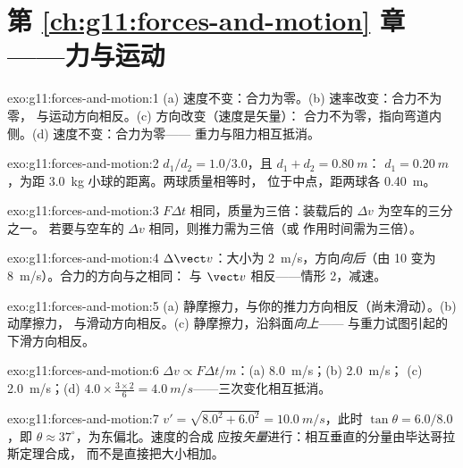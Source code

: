 \section*{第 \ref{ch:g11:forces-and-motion} 章——力与运动}

\begin{solution}{exo:g11:forces-and-motion:1}
(a) 速度不变：合力为零。(b) 速率改变：合力不为零，
与运动方向相反。(c) 方向改变（速度是矢量）：
合力不为零，指向弯道内侧。(d) 速度不变：合力为零——
重力与阻力相互抵消。
\end{solution}

\begin{solution}{exo:g11:forces-and-motion:2}
$d_1/d_2 = 1.0/3.0$，且 $d_1 + d_2 = \qty{0.80}{m}$：
$d_1 = \qty{0.20}{m}$，为距 \qty{3.0}{kg} 小球的距离。两球质量相等时，
位于中点，距两球各 \qty{0.40}{m}。
\end{solution}

\begin{solution}{exo:g11:forces-and-motion:3}
$F\Delta t$ 相同，质量为三倍：装载后的 $\Delta v$ 为空车的三分之一。
若要与空车的 $\Delta v$ 相同，则推力需为三倍（或
作用时间需为三倍）。
\end{solution}

\begin{solution}{exo:g11:forces-and-motion:4}
$\Delta \vect v$：大小为 \qty{2}{m/s}，方向\emph{向后}（由
\num{10} 变为 \qty{8}{m/s}）。合力的方向与之相同：
与 $\vect v$ 相反——情形 2，减速。
\end{solution}

\begin{solution}{exo:g11:forces-and-motion:5}
(a) 静摩擦力，与你的推力方向相反（尚未滑动）。(b) 动摩擦力，
与滑动方向相反。(c) 静摩擦力，沿斜面\emph{向上}——
与重力试图引起的下滑方向相反。
\end{solution}

\begin{solution}{exo:g11:forces-and-motion:6}
$\Delta v \propto F\Delta t/m$：(a) \qty{8.0}{m/s}；(b) \qty{2.0}{m/s}；
(c) \qty{2.0}{m/s}；(d) $4.0 \times \frac{3 \times 2}{6} =
\qty{4.0}{m/s}$——三次变化相互抵消。
\end{solution}

\begin{solution}{exo:g11:forces-and-motion:7}
$v' = \sqrt{8.0^2 + 6.0^2} = \qty{10.0}{m/s}$，此时 $\tan\theta =
6.0/8.0$，即 $\theta \approx 37^\circ$，为东偏北。速度的合成
应按\emph{矢量}进行：相互垂直的分量由毕达哥拉斯定理合成，
而不是直接把大小相加。
\end{solution}

